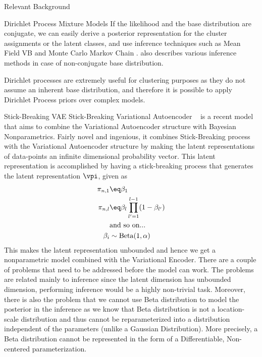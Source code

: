 \documentclass{article}
\begin{document}
\begin{psection}{Relevant Background}
\begin{psubsection}{Dirichlet Process Mixture Models}
		If the likelihood and the base distribution are conjugate, we can easily derive a posterior representation for the cluster assignments or the latent classes, and use inference techniques such as Mean Field VB \citep{blei} and Monte Carlo Markov Chain \citep{esc-west, neal}.	 also describes various inference methods in case of non-conjugate base distribution.

		Dirichlet processes are extremely useful for clustering purposes as they do not assume an inherent base distribution, and therefore it is possible to apply Dirichlet Process priors over complex models.

	\end{psubsection}

	\begin{psubsection}{Stick-Breaking VAE}
		Stick-Breaking Variational Autoencoder ~\citep{nalisnick2016deep} is a recent model that aims to combine the Variational Autoencoder structure with Bayesian Nonparametrics. Fairly novel and ingenious, it combines Stick-Breaking process with the Variational Autoencoder structure by making the latent representations of data-points an infinite dimensional probability vector. This latent representation is accomplished by having a stick-breaking process that generates the latent representation $\vpi$, given as
		\begin{align*}
			\pi_{n,1} &\eq \beta_1 \\
			\pi_{n,l} &\eq \beta_l \prod_{l' = 1}^{l - 1} (1 - \beta_{l'}) \\
			&\text{and so on...} \\
			\beta_{i} &\sim \text{Beta}(1,\alpha)
		\end{align*}
		This makes the latent representation unbounded and hence we get a nonparametric model combined with the Variational Encoder. There are a couple of problems that need to be addressed before the model can work. The problems are related mainly to inference since the latent dimension has unbounded dimension, performing inference would be a highly non-trivial task. Moreover, there is also the problem that we cannot use Beta distribution to model the posterior in the inference as we know that Beta distribution is not a location-scale distribution and thus cannot be reparameterized into a distribution independent of the parameters (unlike a Gaussian Distribution). More precisely, a Beta distribution cannot be represented in the form of a Differentiable, Non-centered parameterization.


\end{psubsection}
\end{psection}
\end{document}
